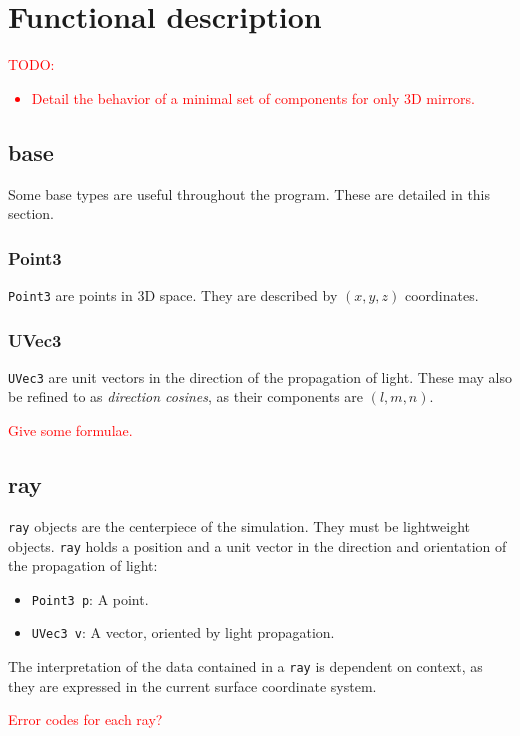\section{Functional description}

\textcolor{red}{TODO: \begin{itemize}
\item Detail the behavior of a minimal set of components for
only 3D mirrors.
\end{itemize}}

\subsection{base}
Some base types are useful throughout the program. These are detailed in this
section.

\subsubsection{Point3}
\lstinline{Point3} are points in 3D space. They are described by $(x, y, z)$
coordinates.

\subsubsection{UVec3}
\lstinline{UVec3} are unit vectors in the direction of the propagation
of light. These may also be refined to as \emph{direction cosines},
as their components are $(l, m, n)$.

\textcolor{red}{Give some formulae.}

\subsection{ray}
\lstinline{ray} objects are the centerpiece of the simulation. They must be
lightweight objects.  \lstinline{ray} holds a position and a unit vector in the
direction and orientation of the propagation of light:

\begin{itemize}
\item \lstinline{Point3 p}: A point.
\item \lstinline{UVec3 v}: A vector, oriented by light propagation.
\end{itemize}

The interpretation of the data contained in a \lstinline{ray} is dependent
on context, as they are expressed in the current surface coordinate system.

\textcolor{red}{Error codes for each ray?}

